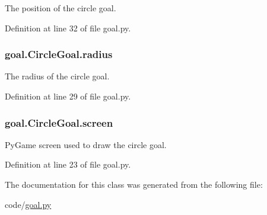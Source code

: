 The position of the circle goal. 



Definition at line 32 of file goal.\-py.

\hypertarget{classgoal_1_1CircleGoal_ab0dbe63cd28b07d45ceedf1bce771b07}{
\subsubsection[{radius}]{\setlength{\rightskip}{0pt plus 5cm}goal.\-Circle\-Goal.\-radius}}\label{classgoal_1_1CircleGoal_ab0dbe63cd28b07d45ceedf1bce771b07}


The radius of the circle goal. 



Definition at line 29 of file goal.\-py.

\hypertarget{classgoal_1_1CircleGoal_a0868d7060d53cd1528aa699f65db3df3}{
\subsubsection[{screen}]{\setlength{\rightskip}{0pt plus 5cm}goal.\-Circle\-Goal.\-screen}}\label{classgoal_1_1CircleGoal_a0868d7060d53cd1528aa699f65db3df3}


Py\-Game screen used to draw the circle goal. 



Definition at line 23 of file goal.\-py.



The documentation for this class was generated from the following file\-:\begin{DoxyCompactItemize}
\item 
code/\hyperlink{goal_8py}{goal.\-py}\end{DoxyCompactItemize}
